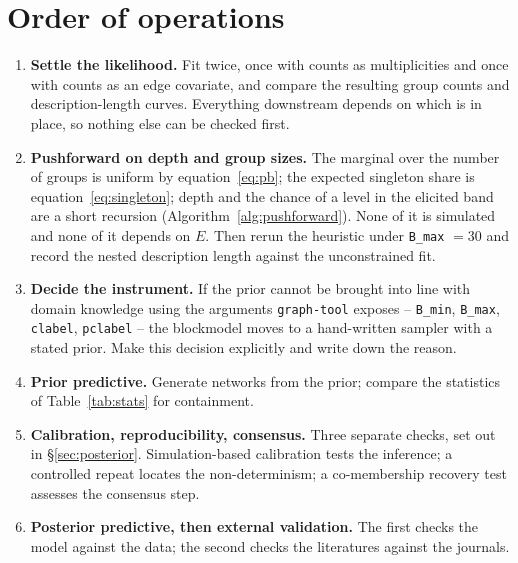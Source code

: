 \documentclass[11pt]{article}
\newcommand{\code}[1]{\texttt{\small #1}}
\begin{document}
\section{Order of operations}
\label{sec:order}

\begin{enumerate}[leftmargin=2em, itemsep=0.4em]
\item \textbf{Settle the likelihood.} Fit twice, once with counts as
  multiplicities and once with counts as an edge covariate, and compare the
  resulting group counts and description-length curves. Everything downstream
  depends on which is in place, so nothing else can be checked first.
\item \textbf{Pushforward on depth and group sizes.} The marginal over the
  number of groups is uniform by equation~\eqref{eq:pb}; the expected
  singleton share is equation~\eqref{eq:singleton}; depth and the chance of a
  level in the elicited band are a short recursion
  (Algorithm~\ref{alg:pushforward}). None of it is simulated and none of it
  depends on $E$. Then rerun the heuristic under \code{B_max} $= 30$ and
  record the nested description length against the unconstrained fit.
\item \textbf{Decide the instrument.} If the prior cannot be brought into line
  with domain knowledge using the arguments \code{graph-tool} exposes --
  \code{B_min}, \code{B_max}, \code{clabel}, \code{pclabel} -- the blockmodel
  moves to a hand-written sampler with a stated prior. Make this decision
  explicitly and write down the reason.
\item \textbf{Prior predictive.} Generate networks from the prior; compare the
  statistics of Table~\ref{tab:stats} for containment.
\item \textbf{Calibration, reproducibility, consensus.} Three separate checks,
  set out in \S\ref{sec:posterior}. Simulation-based calibration tests the
  inference; a controlled repeat locates the non-determinism; a co-membership
  recovery test assesses the consensus step.
\item \textbf{Posterior predictive, then external validation.} The first checks
  the model against the data; the second checks the literatures against the
  journals.
\end{enumerate}
\end{document}

